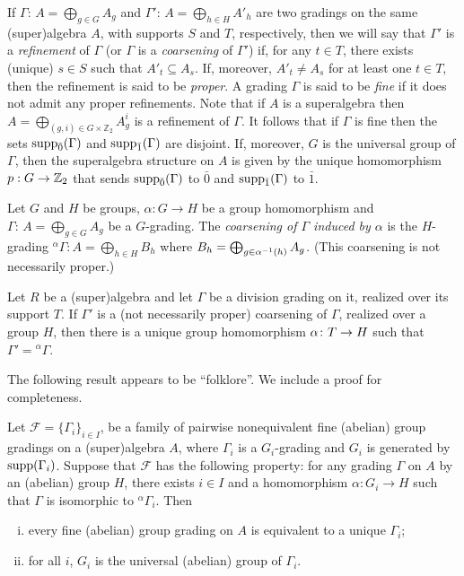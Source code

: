If $\Gamma:\,A=\bigoplus_{g\in G} A_g$ and $\Gamma':\,A=\bigoplus_{h\in H} A'_h$ are two gradings on the same (super)algebra $A$, with supports $S$ and $T$, respectively, then we will say that $\Gamma'$ is a {\em refinement} of $\Gamma$ (or $\Gamma$ is a {\em coarsening} of $\Gamma'$) if, for any $t\in T$, there exists (unique) $s\in S$ such that $A'_t\subseteq A_s$. If, moreover, $A'_t\ne A_s$ for at least one $t\in T$, then the refinement is said to be {\em proper}. A grading $\Gamma$ is said to be {\em fine} if it does not admit any proper refinements. 
Note that if $A$ is a superalgebra then $A=\bigoplus_{(g,i)\in G\times\mathbb{Z}_2}A_g^i$ is a refinement of $\Gamma$. 
It follows that if $\Gamma$ is fine then the sets $\operatorname{supp}_{\bar{0}}(\Gamma)$ and $\operatorname{supp}_{\bar{1}}(\Gamma)$ are disjoint. 
If, moreover, $G$ is the universal group of $\Gamma$, then the superalgebra structure on $A$ is given by the unique homomorphism $p: G \to \mathbb{Z}_2$ 
that sends $\operatorname{supp}_{\bar{0}}(\Gamma)$ to $\bar 0$ and $\operatorname{supp}_{\bar{1}}(\Gamma)$ to $\bar 1$.

\begin{defi}
	Let $G$ and $H$ be groups, $\alpha:G\to H$ be a group homomorphism and $\Gamma:\,A=\bigoplus_{g\in G} A_g$ be a $G$-grading. The \emph{coarsening of $\Gamma$ induced by $\alpha$} is the $H$-grading ${}^\alpha \Gamma: A= \bigoplus_{h\in H} B_h$ where
	$ B_h = \bigoplus_{g\in \alpha^{-1} (h)} A_g$. (This coarsening is not necessarily proper.)
\end{defi}

\begin{lemma}\label{lemma:div-grd-unvrsl-grp}
    Let $R$ be a (super)algebra and let $\Gamma$ be a division grading on it, realized over its support $T$. 
    If $\Gamma'$ is a (not necessarily proper) coarsening of $\Gamma$, realized over a group $H$, then there is a unique group homomorphism $\alpha\colon T \to H$ such that $\Gamma' = {}^\alpha \Gamma$.
\end{lemma}

The following result appears to be ``folklore''. We include a proof for completeness.

\begin{lemma}\label{lemma:universal-grp}
	Let $\mathcal{F}=\{\Gamma_i\}_{i\in I}$, be a family of pairwise nonequivalent fine (abelian) group gradings on a (super)algebra $A$, where $\Gamma_i$ is a $G_i$-grading and $G_i$ is generated by $\operatorname{supp}(\Gamma_i)$. Suppose that $\mathcal{F}$ has the following property: 
	for any grading $\Gamma$ on $A$ by an (abelian) group $H$, there exists $i\in I$ and a homomorphism $\alpha:G_i\to H$ such that $\Gamma$ 
	is isomorphic to ${}^\alpha\Gamma_i$. Then
	\begin{enumerate}[(i)]
		\item every fine (abelian) group grading on $A$ is equivalent to a unique $\Gamma_i$;
		\item for all $i$, $G_i$ is the universal (abelian) group of $\Gamma_i$.
	\end{enumerate}
\end{lemma}

